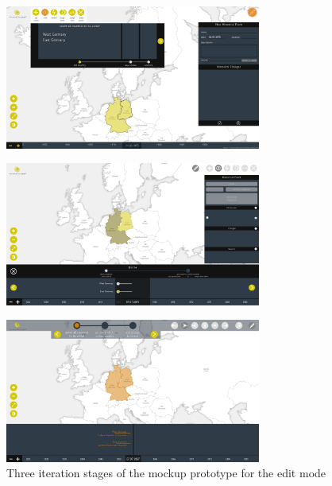 \begin{minipage}[t]{1.0\textwidth}

\vspace{1em}
\centering
\begin{figure}[H]
  \centering
  \includegraphics[width=0.75\textwidth]{graphics/development/user_interface_design_process/mockup_prototype_1.png}
\end{figure}
\begin{figure}[H]
  \centering
  \includegraphics[width=0.75\textwidth]{graphics/development/user_interface_design_process/mockup_prototype_2.png}
\end{figure}
\begin{figure}[H]
  \centering
  \includegraphics[width=0.75\textwidth]{graphics/development/user_interface_design_process/mockup_prototype_3.png}
  \caption{Three iteration stages of the mockup prototype for the edit mode}
  \label{fig:mockup_prototypes}
\end{figure}

\end{minipage}

